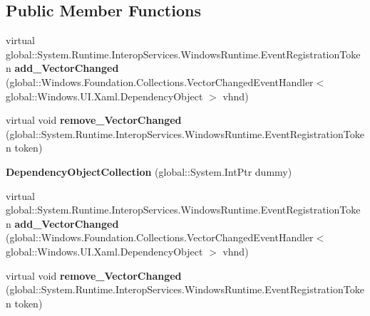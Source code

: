 \subsection*{Public Member Functions}
\begin{DoxyCompactItemize}
\item 
\mbox{\label{class_windows_1_1_u_i_1_1_xaml_1_1_dependency_object_collection_a4891caca0ff7188ffc71a5e248053e6d}} 
virtual global\+::\+System.\+Runtime.\+Interop\+Services.\+Windows\+Runtime.\+Event\+Registration\+Token {\bfseries add\+\_\+\+Vector\+Changed} (global\+::\+Windows.\+Foundation.\+Collections.\+Vector\+Changed\+Event\+Handler$<$ global\+::\+Windows.\+U\+I.\+Xaml.\+Dependency\+Object $>$ vhnd)
\item 
\mbox{\label{class_windows_1_1_u_i_1_1_xaml_1_1_dependency_object_collection_a940ed4f33f8d86b62b76cddcdf7bdc55}} 
virtual void {\bfseries remove\+\_\+\+Vector\+Changed} (global\+::\+System.\+Runtime.\+Interop\+Services.\+Windows\+Runtime.\+Event\+Registration\+Token token)
\item 
\mbox{\label{class_windows_1_1_u_i_1_1_xaml_1_1_dependency_object_collection_aae876d96e705148d2425bda950792fb8}} 
{\bfseries Dependency\+Object\+Collection} (global\+::\+System.\+Int\+Ptr dummy)
\item 
\mbox{\label{class_windows_1_1_u_i_1_1_xaml_1_1_dependency_object_collection_a4891caca0ff7188ffc71a5e248053e6d}} 
virtual global\+::\+System.\+Runtime.\+Interop\+Services.\+Windows\+Runtime.\+Event\+Registration\+Token {\bfseries add\+\_\+\+Vector\+Changed} (global\+::\+Windows.\+Foundation.\+Collections.\+Vector\+Changed\+Event\+Handler$<$ global\+::\+Windows.\+U\+I.\+Xaml.\+Dependency\+Object $>$ vhnd)
\item 
\mbox{\label{class_windows_1_1_u_i_1_1_xaml_1_1_dependency_object_collection_a940ed4f33f8d86b62b76cddcdf7bdc55}} 
virtual void {\bfseries remove\+\_\+\+Vector\+Changed} (global\+::\+System.\+Runtime.\+Interop\+Services.\+Windows\+Runtime.\+Event\+Registration\+Token token)

\end{DoxyCompactItemize}
